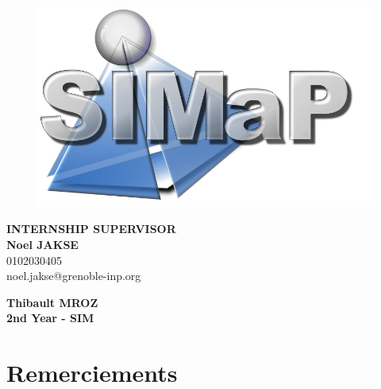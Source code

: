 \documentclass[11pt]{report}
\begin{document}
\begin{titlepage}
\begin{center}
        \begin{figure}[!h]
            \centering
            \includegraphics[scale=1.2]{logo_SIMaP_801.png}
        \end{figure}
              \vfill 
        
        \begin{minipage}[d]{1\linewidth}
            \begin{flushright} \large
            \textbf{INTERNSHIP SUPERVISOR}\\
                \textbf{Noel JAKSE}\\
                0102030405\\
                noel.jakse@grenoble-inp.org
            \end{flushright}
        \end{minipage}
        
        \bigskip
             
        \begin{minipage}[d]{1\linewidth}
              \begin{flushleft} \large
              \textbf{Thibault MROZ}\\
                \textbf{2nd Year - SIM}\\
              \end{flushleft}
         \end{minipage}
          \end{center}        
\end{titlepage}

\tableofcontents

\setcounter{chapter}{0}
    \chapter*{Remerciements}
\end{document}

